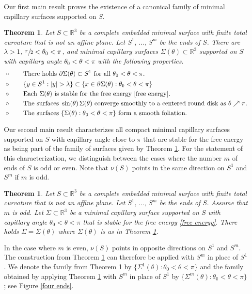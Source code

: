 \documentclass[11pt]{amsart}
\newtheorem{thm}[prop]{Theorem}
\begin{document}
Our first main result proves the existence of a  canonical family of minimal capillary surfaces supported on $S$.

\begin{thm} \label{THM A}
	Let $S\subset \mathbb{R}^3$ be a complete embedded minimal surface with finite total curvature that is  not an affine plane. Let $S^1,\,\ldots,\, S^m$ be the ends of $S$. There are $\lambda>1$,  $\sfrac{\pi}2<\theta_0<\pi$, and minimal capillary surfaces $\Sigma(\theta)\subset \mathbb{R}^3$ supported on $S$ with capillary angle $\theta_0<\theta<\pi$ with the following properties.
	\begin{align*}
		&\circ  \qquad \text{There holds $\partial \Sigma(\theta)\subset S^1$ for  all $\theta_0<\theta<\pi$.}
		\\&\circ \qquad \{y\in S^1:|y|> \lambda\}\subset \{x\in \partial \Sigma(\theta):\theta_0<\theta<\pi\} 
		\\	&\circ \qquad \text{Each $\Sigma(\theta)$ is stable for the free energy \eqref{free energy}.}
		\\&\circ \qquad \text{The surfaces }\sin(\theta)\,\Sigma(\theta)\text{ converge smoothly to a centered round disk as $\theta\nearrow \pi$.}
		\\ &\circ \qquad \text{The surfaces $\{\Sigma(\theta):\theta_0<\theta<\pi\}$ form  a smooth foliation.}
	\end{align*}
\end{thm}
Our second main result characterizes all compact minimal capillary surfaces supported on $S$ with capillary angle close to $\pi$ that are stable for the free energy  as being part of the family of surfaces given by Theorem \ref{THM A}. For the statement of this characterization, we distinguish between the cases where the number $m$ of ends of $S$ is odd or even. Note that $\nu(S)$ points in the same direction on $S^1$ and $S^m$ if $m$ is odd.
\begin{thm} \label{THM B} Let $S\subset \mathbb{R}^3$ be a complete embedded minimal surface with finite total curvature that is not an affine plane. Let $S^1,\,\ldots,\, S^m$ be the ends of $S.$ Assume that $m$ is odd. Let $\Sigma\subset \mathbb{R}^3$ be a   minimal capillary surface supported on $S$ with capillary angle $\theta_0<\theta<\pi$ that   is stable  for the free energy \eqref{free energy}. There holds $\Sigma=\Sigma(\theta)$ where $\Sigma(\theta)$ is as in Theorem \ref{THM A}.
\end{thm} 
In the case where $m$ is even, $\nu(S)$ points in opposite directions on $S^1$ and $S^m$. The construction from Theorem \ref{THM A} can therefore be applied with $S^m$ in place of $S^1$. We denote the family from Theorem \ref{THM A} by $\{\Sigma^1(\theta):\theta_0<\theta<\pi\}$ and the family obtained by applying Theorem \ref{THM A} with $S^m$ in place of $S^1$ by $\{\Sigma^m(\theta):\theta_0<\theta<\pi\}$; see Figure \ref{four ends}.
\end{document}
